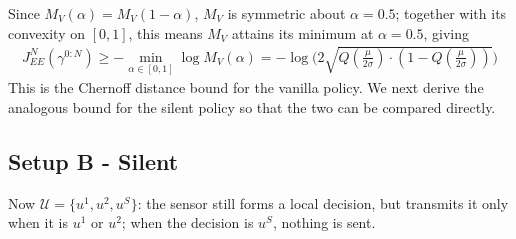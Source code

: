 \documentclass[11pt]{article}
\newcommand{\JNEE}{J^N_{EE}(\gamma^{0:N})}
\begin{document}
Since $M_V(\alpha) = M_V(1-\alpha)$, $M_V$ is symmetric about $\alpha = 0.5$; together with its convexity on $[0,1]$, this means $M_V$ attains its minimum at $\alpha = 0.5$, giving
\begin{align}
    \JNEE \geq -\min_{\alpha\in[0,1]}\log M_{V}(\alpha) = -\log\bigg(2 \sqrt{Q(\frac{\mu}{2\sigma}) \cdot (1-Q(\frac{\mu}{2\sigma}))}\bigg)
\end{align}
This is the Chernoff distance bound for the vanilla policy. We next derive the analogous bound for the silent policy so that the two can be compared directly.
\subsection*{Setup B - Silent}
Now $\mathcal{U} = \{u^1, u^2, u^S\}$: the sensor still forms a local decision, but transmits it only when it is $u^1$ or $u^2$; when the decision is $u^S$, nothing is sent.
\end{document}
